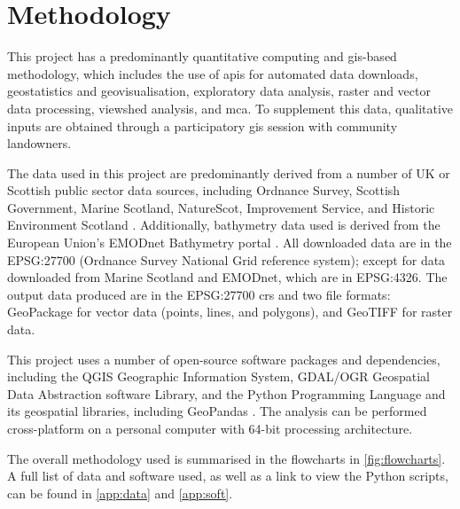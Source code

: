 \chapter{Methodology}

This project has a predominantly quantitative computing and \gls{gis}-based methodology, which includes the use of \glspl{api} for automated data downloads, geostatistics and geovisualisation, exploratory data analysis, raster and vector data processing, viewshed analysis, and \gls{mca}. To supplement this data, qualitative inputs are obtained through a participatory \gls{gis} session with community landowners.

The data used in this project are predominantly derived from a number of UK or Scottish public sector data sources, including Ordnance Survey, Scottish Government, Marine Scotland, NatureScot, Improvement Service, and Historic Environment Scotland \autocite{os-downloads,spatialdata}. Additionally, bathymetry data used is derived from the European Union's EMODnet Bathymetry portal \autocite{emodnet-bathymetry}. All downloaded data are in the EPSG:27700 (Ordnance Survey National Grid reference system); except for data downloaded from Marine Scotland and EMODnet, which are in EPSG:4326. The output data produced are in the EPSG:27700 \gls{crs} and two file formats: GeoPackage for vector data (points, lines, and polygons), and GeoTIFF for raster data.

This project uses a number of open-source software packages and dependencies, including the QGIS Geographic Information System, GDAL/OGR Geospatial Data Abstraction software Library, and the Python Programming Language and its geospatial libraries, including GeoPandas \autocite{qgis,gdal,python,geopandas}. The analysis can be performed cross-platform on a personal computer with 64-bit processing architecture.

The overall methodology used is summarised in the flowcharts in \autoref{fig:flowcharts}. A full list of data and software used, as well as a link to view the Python scripts, can be found in \autoref{app:data} and \autoref{app:soft}.

